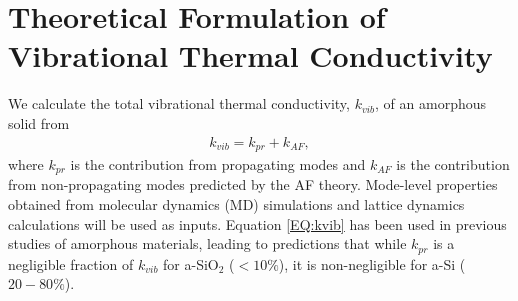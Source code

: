 \documentclass[aps,prb,twocolumn,superscriptaddress,footinbib,amsmath,amssymb,floatfix]{revtex4}
\begin{document}
\section{\label{S:Theory:Thermal}Theoretical Formulation of 
Vibrational Thermal Conductivity}

We calculate the total vibrational thermal conductivity, $k_{vib}$, 
of an amorphous solid from 
\begin{equation}\label{EQ:kvib}
\begin{split}
k_{vib} = k_{pr} + k_{AF},
\end{split}
\end{equation}
where $k_{pr}$ is the contribution from propagating modes
\cite{ziman_electrons_2001} 
and $k_{AF}$ is the contribution from non-propagating modes predicted 
by the AF theory.\cite{feldman_thermal_1993} Mode-level 
properties obtained from molecular dynamics (MD) simulations and 
lattice dynamics calculations will be used as inputs. 
Equation \eqref{EQ:kvib} has been used in 
previous studies of amorphous materials, 
leading to predictions that while $k_{pr}$ is a negligible 
fraction of $k_{vib}$ for a-SiO$_2$ ($< 10\%$),
\cite{graebner_phonon_1986,freeman_thermal_1986,
love_estimate_1990,baldi_thermal_2008} 
it is non-negligible 
for a-Si ($20-80\%$).
\cite{feldman_thermal_1993,cahill_thermal_1994,
feldman_numerical_1999,liu_high_2009,yang_anomalously_2010,
he_heat_2011}
\end{document}
